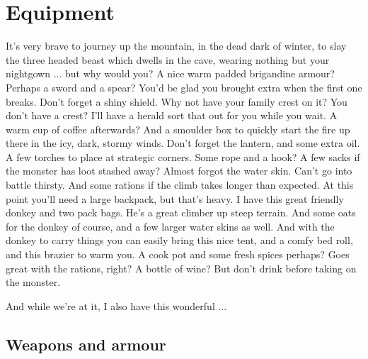

\cleardoublepage

\chapter*{Equipment}

\begin{readoutloud}
It's very brave to journey up the mountain, in the dead dark of winter, to slay the three headed beast which dwells in the cave, wearing nothing but your nightgown ... but why would you? A nice warm padded brigandine armour? Perhaps a sword and a spear? You'd be glad you brought extra when the first one breaks. Don't forget a shiny shield. Why not have your family crest on it? You don't have a crest? I'll have a herald sort that out for you while you wait. A warm cup of coffee afterwards? And a smoulder box to quickly start the fire up there in the icy, dark, stormy winds. Don't forget the lantern, and some extra oil. A few torches to place at strategic corners. Some rope and a hook? A few sacks if the monster has loot stashed away? Almost forgot the water skin. Can't go into battle thirsty. And some rations if the climb takes longer than expected. At this point you'll need a large backpack, but that's heavy. I have this great friendly donkey and two pack bags. He's a great climber up steep terrain. And some oats for the donkey of course, and a few larger water skins as well. And with the donkey to carry things you can easily bring this nice tent, and a comfy bed roll, and this brazier to warm you. A cook pot and some fresh spices perhaps? Goes great with the rations, right? A bottle of wine? But don't drink before taking on the monster.

And while we're at it, I also have this wonderful ...
\end{readoutloud}




\section*{Weapons and armour}

